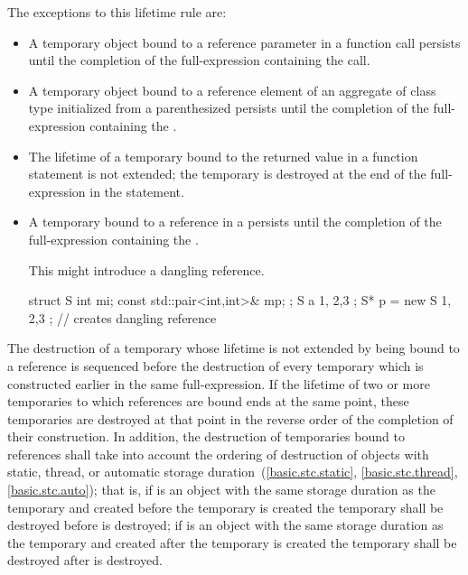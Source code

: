 The exceptions to this lifetime rule are:
\begin{itemize}
\item A temporary object bound to a reference parameter in a function call
persists until the completion of the full-expression containing the call.

\item A temporary object bound to a reference element of
an aggregate of class type initialized from
a parenthesized 
persists until the completion of the full-expression
containing the .

\item The lifetime of a temporary bound to the returned value in a function  statement is not extended; the temporary is destroyed at the end of the full-expression in the  statement.

\item A temporary bound to a reference in a  persists until the completion of the full-expression containing the .
\begin{note}
This might introduce a dangling reference.
\end{note}
\begin{example}
\begin{codeblock}
struct S { int mi; const std::pair<int,int>& mp; };
S a { 1, {2,3} };
S* p = new S{ 1, {2,3} };       // creates dangling reference
\end{codeblock}
\end{example}
\end{itemize}

\pnum
The destruction of a temporary whose lifetime is not extended by being
bound to a reference is sequenced before the destruction of every
temporary which is constructed earlier in the same full-expression.
If the lifetime of two or more temporaries to which references are bound ends
at the same point,
these temporaries are destroyed at that point in the reverse order of the
completion of their construction.
In addition, the destruction of temporaries bound to references shall
take into account the ordering of destruction of objects with static, thread, or
automatic storage duration~(\ref{basic.stc.static}, \ref{basic.stc.thread}, \ref{basic.stc.auto});
that is, if
is an object with the same storage duration as the temporary and
created before the temporary is created
the temporary shall be destroyed before
is destroyed;
if
is an object with the same storage duration as the temporary and
created after the temporary is created
the temporary shall be destroyed after
is destroyed.

